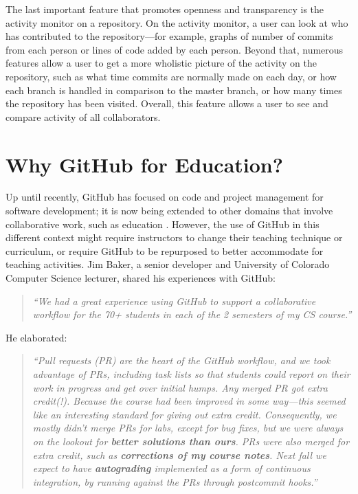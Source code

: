 The last important feature that promotes openness and transparency is the activity monitor on a repository. On the activity monitor, a user can look at who has contributed to the repository---for example, graphs of number of commits from each person or lines of code added by each person. Beyond that, numerous features allow a user to get a more wholistic picture of the activity on the repository, such as what time commits are normally made on each day, or how each branch is handled in comparison to the master branch, or how many times the repository has been visited. Overall, this feature allows a user to see and compare activity of all collaborators.

\section{Why GitHub for Education?}
Up until recently, GitHub has focused on code and project management for software development; it is now being extended to other domains that involve collaborative work, such as education \cite{Griffin:2013:GCJ:2458539.2458551}. However, the use of GitHub in this different context might require instructors to change their teaching technique or curriculum, or require GitHub to be repurposed to better accommodate for teaching activities. Jim Baker, a senior developer and University of Colorado Computer Science lecturer, shared his experiences with GitHub: \begin{quote}\textit{``We had a great experience using GitHub to support a collaborative workflow for the 70+ students in each of the 2 semesters of my CS course.''}\end{quote} He elaborated: \begin{quote}\textit{``Pull requests (PR) are the heart of the GitHub workflow, and we took advantage of PRs, including task lists so that students could report on their work in progress and get over initial humps. Any merged PR got extra credit(!). Because the course had been improved in some way---this seemed like an interesting standard for giving out extra credit. Consequently, we mostly didn't merge PRs for labs, except for bug fixes, but we were always on the lookout for \textbf{better solutions than ours}. PRs were also merged for extra credit, such as \textbf{corrections of my course notes}. Next fall we expect to have \textbf{autograding} implemented as a form of continuous integration, by running against the PRs through postcommit hooks.''}\end{quote}

